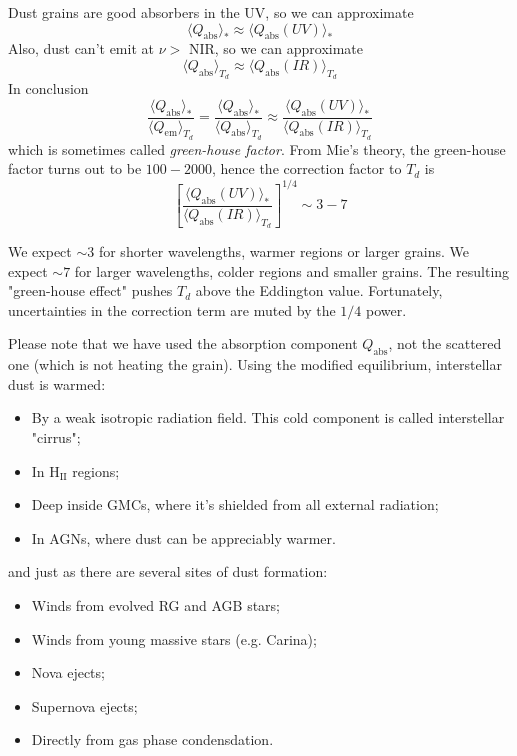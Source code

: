 \par Dust grains are good absorbers in the UV, so we can approximate $$\langle Q_{\text{abs}} \rangle_{*} \approx \langle Q_{\text{abs}}(UV) \rangle_{*}$$ Also, dust can't emit at $\nu >$ NIR, so we can approximate $$\langle Q_{\text{abs}} \rangle_{T_{d}}\approx \langle Q_{\text{abs}}(IR) \rangle_{T_{d}}$$ In conclusion
\begin{equation*}
    \frac{\langle Q_{\text{abs}} \rangle_{*}}{\langle Q_{\text{em}} \rangle_{T_{d}}} = \frac{\langle Q_{\text{abs}} \rangle_{*}}{\langle Q_{\text{abs}} \rangle_{T_{d}}} \approx \frac{\langle Q_{\text{abs}}(UV) \rangle_{*}}{\langle Q_{\text{abs}}(IR) \rangle_{T_{d}}}
\end{equation*}
which is sometimes called \emph{green-house factor}. From Mie's theory, the green-house factor turns out to be $100-2000$, hence the correction factor to $T_{d}$ is 
\begin{equation*}
    \left[\frac{\langle Q_{\text{abs}}(UV) \rangle_{*}}{\langle Q_{\text{abs}}(IR) \rangle_{T_{d}}}\right]^{1/4} \sim 3-7
\end{equation*}
\par We expect $\sim 3$ for shorter wavelengths, warmer regions or larger grains. We expect $\sim 7$ for larger wavelengths, colder regions and smaller grains. The resulting "green-house effect" pushes $T_{d}$ above the Eddington value. Fortunately, uncertainties in the correction term are muted by the $1/4$ power.
\par Please note that we have used the absorption component $Q_{\text{abs}}$, not the scattered one (which is not heating the grain). Using the modified equilibrium, interstellar dust is warmed:
\begin{itemize}
    \item By a weak isotropic radiation field. This cold component is called
interstellar "cirrus";
    \item In H$_{\text{II}}$ regions;
    \item Deep inside GMCs, where it's shielded from all external radiation;
    \item In AGNs, where dust can be appreciably warmer.
\end{itemize}
and just as there are several sites of dust formation:
\begin{itemize}
    \item Winds from evolved RG and AGB stars;
    \item Winds from young massive stars (e.g. Carina);
    \item Nova ejects;
    \item Supernova ejects;
    \item Directly from gas phase condensdation.
\end{itemize}
